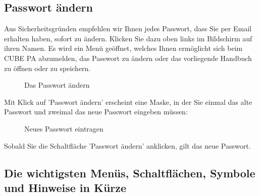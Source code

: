 \subsection{Passwort ändern}
\label{bkm:Ref434828103}

Aus Sicherheitsgründen empfehlen wir Ihnen jedes Passwort, dass Sie per Email erhalten haben, sofort zu ändern. Klicken Sie dazu oben links im Bildschirm auf ihren Namen. Es wird ein Menü geöffnet, welches Ihnen ermöglicht sich beim CUBE PA abzumelden, das Passwort zu ändern oder das vorliegende Handbuch zu öffnen oder zu speichern.

\begin{figure}[H]
\caption{Das Passwort ändern}
\end{figure}

Mit Klick auf 'Passwort ändern' erscheint eine Maske, in der Sie einmal das alte Passwort und zweimal das neue Passwort eingeben müssen:

\begin{figure}[H]
\caption{Neues Passwort eintragen}
\end{figure}

Sobald Sie die Schaltfläche 'Passwort ändern' anklicken, gilt das neue Passwort.

\subsection{Die wichtigsten Menüs, Schaltflächen, Symbole und Hinweise in Kürze}

